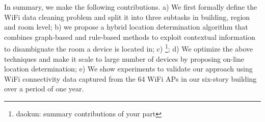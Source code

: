 











In summary, we make the following contributions. a) We first formally define the WiFi data cleaning problem and split it into three subtasks in building, region and room level; b) we propose a hybrid location determination  algorithm that combines graph-based and rule-based methods to exploit contextual information to disambiguate the room a device is located in; c) \footnote{daokun: summary contributions of your part}; d) We optimize the above techniques and make it scale to large number of devices by proposing on-line location determination; e) We show experiments to validate our approach using WiFi connectivity data captured from the 64 WiFi APs in our six-story building over a period of one year. 



